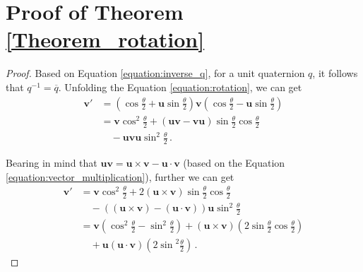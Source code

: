\documentclass[11pt]{article}
\newcommand{\vect}[1]{\mathbf{#1}\xspace}
\begin{document}





\clearpage
\appendix

\section{Proof of Theorem \ref{Theorem_rotation}}
\label{app:proof_theorem1}
\begin{proof}
Based on Equation \ref{equation:inverse_q}, for a unit quaternion $q$, it follows that $q^{-1} = \overline{q}$.
Unfolding the Equation \ref{equation:rotation}, we can get
\begin{align}
    \vect{v'} 
    &= (\cos \frac{\theta}{2} + \vect{u} \sin \frac{\theta}{2}) \vect{v} (\cos \frac{\theta}{2} - \vect{u} \sin \frac{\theta}{2}) \nonumber\\
    &=\vect{v} {\cos}^2 \frac{\theta}{2} + (\vect{u} \vect{v} - \vect{v} \vect{u}) \sin \frac{\theta}{2} \cos \frac{\theta}{2} \nonumber\\
    &\quad - \vect{u} \vect{v} \vect{u} {\sin}^2 \frac{\theta}{2} \, .
\end{align}



Bearing in mind that $\vect{u} \vect{v} = \vect{u} \times \vect{v} - \vect{u} \cdot \vect{v}$ (based on the Equation \ref{equation:vector_multiplication}), further we can get
\begin{align}
    \vect{v'} 
    &=\vect{v} {\cos}^2 \frac{\theta}{2} + 2(\vect{u} \times \vect{v}) \sin \frac{\theta}{2} \cos \frac{\theta}{2}  
    \nonumber \\
    &\quad  - ((\vect{u} \times \vect{v}) - (\vect{u} \cdot \vect{v}))\vect{u} {\sin}^2 \frac{\theta}{2} 
    \nonumber\\
    &=\vect{v} ({\cos}^2 \frac{\theta}{2} - {\sin}^2 \frac{\theta}{2}) + (\vect{u} \times \vect{v}) (2\sin \frac{\theta}{2} \cos \frac{\theta}{2}) \nonumber\\
    & \quad +
    \vect{u} (\vect{u} \cdot \vect{v}) ({2\sin}^2 \frac{\theta}{2}) \, .
\end{align}




\end{proof}
\end{document}
